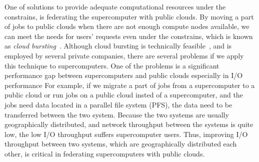 One of solutions to provide adequate computational resources under the constrains, is federating the supercomputer with public clouds.
By moving a part of jobs to public clouds when there are not enough
compute nodes available, we can meet the needs for users' requests even under the constrains, which is known as \emph{cloud bursting}~\cite{Optimizing_Service_Level_Agreements_for_Autonomic_Cloud_Bursting_Schedulers, A_Framework_for_Data-Intensive_Computing_with_Cloud_Bursting}.
Although cloud bursting is technically feasible~\cite{Eucalyptus,stratos,Seagull}, 
and is employed by several private companies, there are several problems if we apply this technique to supercomputers.
One of the problems is a significant performance gap between supercomputers and public clouds especially in I/O performance
For example, if we migrate a part of jobs from a supercomputer to a public cloud or run jobs on a public cloud insted of a supercomputer, and the jobs need data located in a parallel file system (PFS), the data need to be transferred between the two system.
Because the two systems are usually geographically distributed, and network throughput between the systems is quite low,
the low I/O throughput suffers supercomputer users. Thus, improving I/O throughput between two systems, which are geographically distributed each other, is critical in federating supercomputers with public clouds.

